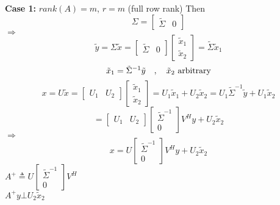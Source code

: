\begin{multicols}{2}
\textbf{Case 1:} $rank(A)=m$, $r=m$ (full row rank)
Then
\[
    \Sigma = \begin{bmatrix}
        \tilde{\Sigma} & 0
    \end{bmatrix}
\]
$\Longrightarrow$
\[
    \tilde{y} = \Sigma \tilde{x} = \begin{bmatrix}
        \tilde{\Sigma} & 0
    \end{bmatrix}\begin{bmatrix}
        \tilde{x}_1 \\ \tilde{x}_2
    \end{bmatrix} = \tilde{\Sigma}\tilde{x}_1
\]
\[
    \tilde{x}_1=\tilde{\Sigma}^{-1}\tilde{y}\quad,\quad \tilde{x}_2\text{ \rm arbitrary}
\]
\[
    x=U\tilde{x}=\begin{bmatrix}
        U_1 & U_2
    \end{bmatrix}\begin{bmatrix}
        \tilde{x}_1 \\ \tilde{x}_2
    \end{bmatrix} = U_1\tilde{x}_1+U_2\tilde{x}_2 = U_1\tilde{\Sigma}^{-1}\tilde{y} + U_1\tilde{x}_2
\]
\[
    =\begin{bmatrix}
        U_1 & U_2
    \end{bmatrix}\begin{bmatrix}
        \tilde{\Sigma}^{-1} \\ 0
    \end{bmatrix}V^Hy+U_2\tilde{x}_2
\]
$\Longrightarrow$
\[
    x=U\begin{bmatrix}
        \tilde{\Sigma}^{-1} \\ 0
    \end{bmatrix}V^Hy + U_2\tilde{x}_2
\]
$
    A^{+}\triangleq U\begin{bmatrix}
        \tilde{\Sigma}^{-1} \\ 0
    \end{bmatrix}V^H
$ \\
$
    A^{+}y \bot U_2\tilde{x}_2
$
\newpage
\end{multicols}